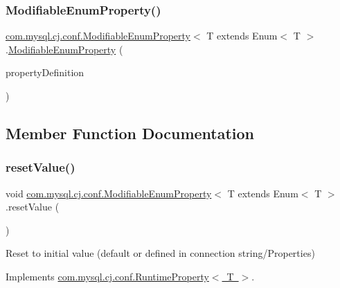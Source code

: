 \subsubsection{\texorpdfstring{Modifiable\+Enum\+Property()}{ModifiableEnumProperty()}}
{\footnotesize\ttfamily \mbox{\hyperlink{classcom_1_1mysql_1_1cj_1_1conf_1_1_modifiable_enum_property}{com.\+mysql.\+cj.\+conf.\+Modifiable\+Enum\+Property}}$<$ T extends Enum$<$ T $>$.\mbox{\hyperlink{classcom_1_1mysql_1_1cj_1_1conf_1_1_modifiable_enum_property}{Modifiable\+Enum\+Property}} (\begin{DoxyParamCaption}\item[{\mbox{\hyperlink{interfacecom_1_1mysql_1_1cj_1_1conf_1_1_property_definition}{Property\+Definition}}$<$ T $>$}]{property\+Definition }\end{DoxyParamCaption})}



\subsection{Member Function Documentation}
\mbox{\label{classcom_1_1mysql_1_1cj_1_1conf_1_1_modifiable_enum_property_a45be76d841ee45583b59419fa45526f6}} 
\subsubsection{\texorpdfstring{reset\+Value()}{resetValue()}}
{\footnotesize\ttfamily void \mbox{\hyperlink{classcom_1_1mysql_1_1cj_1_1conf_1_1_modifiable_enum_property}{com.\+mysql.\+cj.\+conf.\+Modifiable\+Enum\+Property}}$<$ T extends Enum$<$ T $>$.reset\+Value (\begin{DoxyParamCaption}{ }\end{DoxyParamCaption})}

Reset to initial value (default or defined in connection string/\+Properties) 

Implements \mbox{\hyperlink{interfacecom_1_1mysql_1_1cj_1_1conf_1_1_runtime_property_adad737e212723fc3f3da903259377a25}{com.\+mysql.\+cj.\+conf.\+Runtime\+Property$<$ T $>$}}.

